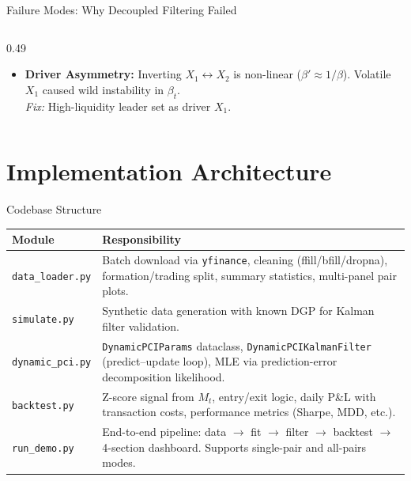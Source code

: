 \documentclass[10pt, aspectratio=169]{beamer}
\begin{document}
\begin{frame}{Failure Modes: Why Decoupled Filtering Failed}
\begin{columns}[T]
\begin{column}{0.49\textwidth}
\begin{itemize}
              \\\emph{Fix:} Trade exclusively on $z(M_t)$.
        \item \textbf{Driver Asymmetry:}
              Inverting $X_1 \leftrightarrow X_2$ is non-linear ($\beta' \approx 1/\beta$). Volatile $X_1$ caused wild instability in $\beta_t$.
              \\\emph{Fix:} High-liquidity leader set as driver $X_1$.
      \end{itemize}
    \end{column}
  \end{columns}
\end{frame}

\section{Implementation Architecture}

\begin{frame}{Codebase Structure}
  \begin{table}[h]
    \centering\small
    \begin{tabular}{@{}lp{9.5cm}@{}}
      \toprule
      \textbf{Module} & \textbf{Responsibility} \\
      \midrule
      \texttt{data\_loader.py}
        & Batch download via \texttt{yfinance}, cleaning (ffill/bfill/dropna),
          formation/trading split, summary statistics, multi-panel pair plots. \\[4pt]
      \texttt{simulate.py}
        & Synthetic data generation with known DGP for Kalman filter
          validation. \\[4pt]
      \texttt{dynamic\_pci.py}
        & \texttt{DynamicPCIParams} dataclass, \texttt{DynamicPCIKalmanFilter}
          (predict--update loop), MLE via prediction-error decomposition
          likelihood. \\[4pt]
      \texttt{backtest.py}
        & Z-score signal from $M_t$, entry/exit logic, daily P\&L with
          transaction costs, performance metrics (Sharpe, MDD, etc.). \\[4pt]
      \texttt{run\_demo.py}
        & End-to-end pipeline: data $\to$ fit $\to$ filter $\to$ backtest
          $\to$ 4-section dashboard. Supports single-pair and all-pairs
          modes. \\
      \bottomrule
    \end{tabular}
  \end{table}
\end{frame}
\end{document}
